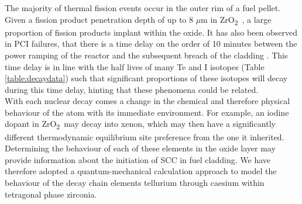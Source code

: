 \documentclass[11pt,a4paper]{article}
\newcommand{\zirconia}{ZrO\textsubscript{2}}
\begin{document}
The majority of thermal fission events occur in the outer rim of a fuel pellet. Given a fission product penetration depth of up to 8 $\mu$m in \zirconia\ \cite{degueldre2001behaviour}, a large proportion of fission products implant within the oxide. It has also been observed in PCI failures, that there is a time delay on the order of 10 minutes between the power ramping of the reactor and the subsequent breach of the cladding \cite{bergenlid1980experimental, wood1983effects, pankaskie1981mechanistic}. This time delay is in line with the half lives of many Te and I isotopes (Table \ref{table:decaydata}) such that significant proportions of these isotopes will decay during this time delay, hinting that these phenomena could be related. \\

With each nuclear decay comes a change in the chemical and therefore physical behaviour of the atom with its immediate environment. For example, an iodine dopant in \zirconia\ may decay into xenon, which may then have a significantly different thermodynamic equilibrium site preference from the one it inherited. Determining the behaviour of each of these elements in the oxide layer may provide information about the initiation of SCC in fuel cladding. We have therefore adopted a quantum-mechanical calculation approach to model the behaviour of the decay chain elements tellurium through caesium within tetragonal phase zirconia. \\
\end{document}
